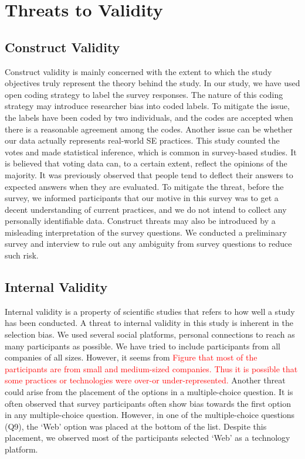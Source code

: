 \section{Threats to Validity}
\label{validity}

\subsection{Construct Validity}
Construct validity is mainly concerned with the extent to which the
study objectives truly represent the theory behind the study\cite{Wohlin2012}. In our study, we have used open coding strategy to label the survey responses. The nature of this coding strategy may introduce researcher bias into coded labels. To mitigate the issue, the labels have been coded by two individuals, and the codes are accepted when there is a reasonable agreement among the codes.  Another issue can be whether our data actually represents real-world SE practices. This study counted the votes and made statistical inference, which is common in survey-based studies. It is believed that voting data can, to a certain extent, reflect the opinions of the majority.  It was previously observed that people tend to deflect their answers to expected answers when they are evaluated. To mitigate the threat, before the survey, we informed participants that our motive in this survey was to get a decent understanding of current practices, and we do not intend to collect any personally identifiable data. Construct threats may also be introduced by a misleading interpretation of the survey questions. We conducted a preliminary survey and interview to rule out any ambiguity from survey questions to reduce such risk.

\subsection{Internal Validity}
Internal validity is a property of scientific studies that refers to how well a study has been conducted. A threat to internal validity in this study is inherent in the selection bias. We used several social platforms, personal connections to reach as many participants as possible. We have tried to include participants from all companies of all sizes. However, it seems from \textcolor{red}{Figure that most of the participants are from small and medium-sized companies. Thus it is possible that some practices or technologies were over-or under-represented.} Another threat could arise from the placement of the options in a multiple-choice question. It is often observed that survey participants often show bias towards the first option in any multiple-choice question. However, in one of the multiple-choice questions (Q9), the `Web' option was placed at the bottom of the list. Despite this placement, we observed most of the participants selected `Web' as a technology platform. 


